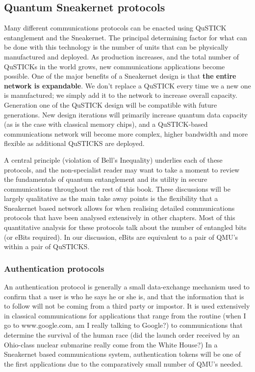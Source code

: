 \documentclass[twocolumn, aps, rmp, amsmath, amssymb, nofootinbib, superscriptaddress, longbibliography, floatfix, table-of-contents, eqsecnum]{revtex4-2}
\begin{document}
\subsection{Quantum Sneakernet protocols}

Many different communications protocols can be enacted using QuSTICK entanglement and the Sneakernet. The principal determining factor for what can be done with this technology is the number of units that can be physically manufactured and deployed. As production increases, and the total number of QuSTICKs in the world grows, new communications applications become possible. One of the major benefits of a Sneakernet design is that \textbf{the entire network is expandable}. We don't replace a QuSTICK every time we a new one is manufactured; we simply add it to the network to increase overall capacity. Generation one of the QuSTICK design will be compatible with future generations. New design iterations will primarily increase quantum data capacity (as is the case with classical memory chips), and a QuSTICK-based communications network will become more complex, higher bandwidth and more flexible as additional QuSTICKS are deployed. 

A central principle (violation of Bell's Inequality) underlies each of these protocols, and the non-specialist reader may want to take a moment to review the fundamentals of quantum entanglement and its utility in secure communications throughout the rest of this book. These discussions will be largely qualitative as the main take away points is the flexibility that a Sneakernet based network allows for when realising detailed communications protocols that have been analysed extensively in other chapters. Most of this quantitative analysis for these protocols talk about the number of entangled bits (or eBits required). In our discussion, eBits are equivalent to a pair of QMU's within a pair of QuSTICKS. 

\subsubsection{Authentication protocols}

An authentication protocol is generally a small data-exchange mechanism used to confirm that a user is who he says he or she is, and that the information that is to follow will not be coming from a third party or impostor. It is used extensively in classical communications for applications that range from the routine (when I go to www.google.com, am I really talking to Google?) to communications that determine the survival of the human race (did the launch order received by an Ohio-class nuclear submarine really come from the White House?) In a Sneakernet based communications system, authentication tokens will be one of the first applications due to the comparatively small number of QMU's needed. 
\end{document}
